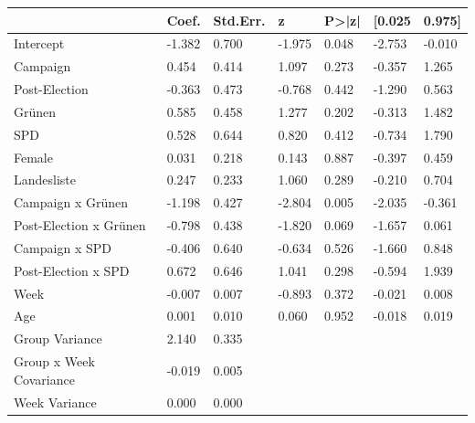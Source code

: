\begin{tabular}{lllllll}
\toprule
 & Coef. & Std.Err. & z & P>|z| & [0.025 & 0.975] \\
\midrule
Intercept & -1.382 & 0.700 & -1.975 & 0.048 & -2.753 & -0.010 \\
Campaign & 0.454 & 0.414 & 1.097 & 0.273 & -0.357 & 1.265 \\
Post-Election & -0.363 & 0.473 & -0.768 & 0.442 & -1.290 & 0.563 \\
Grünen & 0.585 & 0.458 & 1.277 & 0.202 & -0.313 & 1.482 \\
SPD & 0.528 & 0.644 & 0.820 & 0.412 & -0.734 & 1.790 \\
Female & 0.031 & 0.218 & 0.143 & 0.887 & -0.397 & 0.459 \\
Landesliste & 0.247 & 0.233 & 1.060 & 0.289 & -0.210 & 0.704 \\
Campaign x Grünen & -1.198 & 0.427 & -2.804 & 0.005 & -2.035 & -0.361 \\
Post-Election x Grünen & -0.798 & 0.438 & -1.820 & 0.069 & -1.657 & 0.061 \\
Campaign x SPD & -0.406 & 0.640 & -0.634 & 0.526 & -1.660 & 0.848 \\
Post-Election x SPD & 0.672 & 0.646 & 1.041 & 0.298 & -0.594 & 1.939 \\
Week & -0.007 & 0.007 & -0.893 & 0.372 & -0.021 & 0.008 \\
Age & 0.001 & 0.010 & 0.060 & 0.952 & -0.018 & 0.019 \\
Group Variance & 2.140 & 0.335 &  &  &  &  \\
Group x Week Covariance & -0.019 & 0.005 &  &  &  &  \\
Week Variance & 0.000 & 0.000 &  &  &  &  \\
\bottomrule
\end{tabular}
